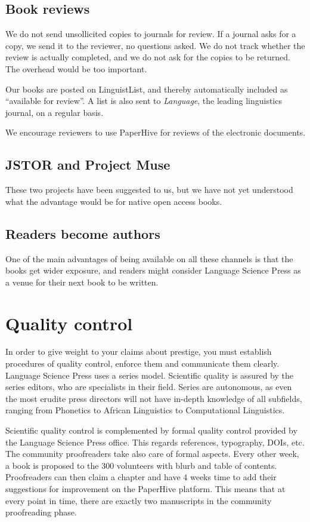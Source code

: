 \documentclass[nonflat,smallfont
]{langsci/langscibook}
\begin{document}
\subsection{Book reviews}
We do not send unsollicited copies to journals for review. If a journal asks for a copy, we send it to the reviewer, no questions asked. We do not track whether the review is actually completed, and we do not ask for the copies to be returned. The overhead would be too important. 

Our books are posted on LinguistList, and thereby automatically included as ``available for review''. A list is also sent to \textit{Language}, the leading linguistics journal, on a regular basis. 

We encourage reviewers to use PaperHive for reviews of the electronic documents.

                      
\subsection{JSTOR and Project Muse}                      
These two projects have been suggested to us, but we have not yet understood what the advantage would be for native open access books.


\subsection{Readers become authors}
One of the main advantages of being available on all these channels is that the books get wider exposure, and readers might consider Language Science Press as a venue for their next book to be written.  

\section{Quality control}\label{sec:qualitycontrol}
In order to give weight to your claims about prestige, you must establish procedures of quality control, enforce them and communicate them clearly. Language Science Press uses a series model. Scientific quality is assured by the series editors, who are specialists in their field. Series are autonomous, as even the most erudite press directors will not have in-depth knowledge of all subfields, ranging from Phonetics to African Linguistics to Computational Linguistics. 

Scientific quality control is complemented by formal quality control provided by the Language Science Press office. This regards references, typography, DOIs, etc. The community proofreaders take also care of formal aspects. Every other week, a book is proposed to the 300 volunteers with blurb and table of contents. Proofreaders can then claim a chapter and have 4 weeks time to add their suggestions for improvement on the PaperHive platform. This means that at every point in time, there are exactly two manuscripts in the community proofreading phase.
\end{document}
